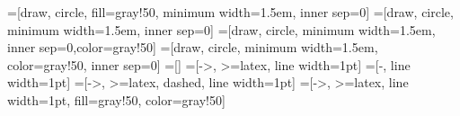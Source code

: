 \newcommand{\nodesize}{1.5em}
\newcommand{\edgeunit}{2*\nodesize}
=[draw, circle, fill=gray!50, minimum width=\nodesize, inner sep=0]
=[draw, circle, minimum width=\nodesize, inner sep=0]
=[draw, circle, minimum width=\nodesize, inner sep=0,color=gray!50]
=[draw, circle, minimum width=\nodesize, color=gray!50, inner sep=0]
=[]
=[->, >=latex, line width=1pt]
=[-, line width=1pt]
=[->, >=latex, dashed, line width=1pt]
=[->, >=latex, line width=1pt, fill=gray!50, color=gray!50]

 




\newcommand\Wider[2][3em]{%
\makebox[\linewidth][c]{%
  \begin{minipage}{\dimexpr\textwidth+#1\relax}
  \raggedright#2
  \end{minipage}%
  }%
}



\newcommand{\I}{\mathbb{I}}
\newcommand{\E}{\mathbb{E}}
\renewcommand{\P}{\mathbb{P}}

\DeclareMathOperator*{\argmax}{arg\,max}
\DeclareMathOperator*{\argmin}{arg\,min}
\newcommand{\KL}{\mathrm{KL}}
\newcommand{\ICL}{\mathrm{ICL}}
\newcommand{\pen}{\mathrm{pen}}


\newcommand{\diag}{\mathop{\mathrm{diag}}}
\newcommand{\bbeta}{\boldsymbol{\beta}}
\newcommand{\balpha}{\boldsymbol{\alpha}}
\newcommand{\btheta}{\boldsymbol{\theta}}
\newcommand{\bY}{\mathbf{Y}}
\newcommand{\M}{\mathcal{M}_{\bK}}
\newcommand{\Mcal}{\mathcal{M}}
\newcommand{\bK}{\mathbf{K}}
\newcommand{\bX}{\mathbf{Y}}
\newcommand{\Xall}{\mathbf{Y}}
\newcommand{\Zall}{\mathbf{Z}}
\newcommand{\bpi}{\mathbf{\pi}}
\newcommand{\btau}{\mathbf{\tau}}
\newcommand{\bZ}{\mathbf{Z}}
\newcommand{\by}{\mathbf{y}}
\newcommand{\bz}{\mathbf{z}}
\newcommand{\ba}{\mathbf{a}}
\newcommand{\bt}{\mathbf{t}}
\newcommand{\bx}{\mathbf{x}}
\newcommand{\bh}{\mathbf{h}}
\newcommand{\bb}{\mathbf{b}}
\newcommand{\bB}{\mathbf{B}}
\newcommand{\bC}{\mathbf{C}}
\newcommand{\bM}{\mathbf{M}}
\newcommand{\bphi}{\boldsymbol{\phi}}
\newcommand{\blambda}{\boldsymbol{\lambda}}
\newcommand{\bepsilon}{\boldsymbol{\epsilon}}
\newcommand{\bpsi}{\boldsymbol{\psi}}
\newcommand{\bm}{\mathbf{m}}
\newcommand{\ra}{\bigskip \textcolor{dgreen}{$\rightarrow$}\;}
\newcommand{\btVFill}{\vskip0pt plus 1filll}
